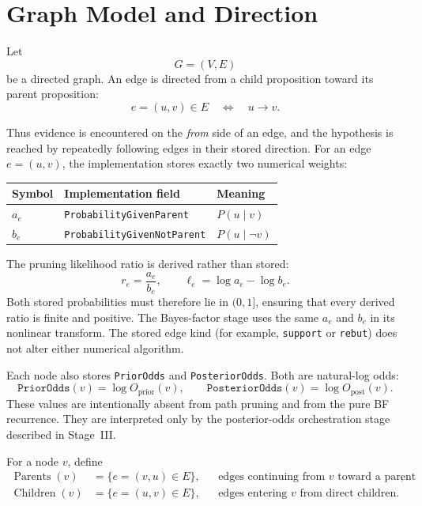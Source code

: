 \documentclass[11pt]{article}
\newcommand{\Parents}{\operatorname{Parents}}
\newcommand{\Children}{\operatorname{Children}}
\begin{document}
\section{Graph Model and Direction}

Let
\[
    G=(V,E)
\]
be a directed graph.  An edge is directed from a child proposition toward its
parent proposition:
\[
    e=(u,v) \in E
    \quad\Longleftrightarrow\quad
    u \longrightarrow v.
\]

Thus evidence is encountered on the \emph{from} side of an edge, and the
hypothesis is reached by repeatedly following edges in their stored direction.
For an edge \(e=(u,v)\), the implementation stores exactly two numerical
weights:

\begin{center}
\begin{tabular}{lll}
\toprule
Symbol & Implementation field & Meaning \\
\midrule
\(a_e\) & \texttt{ProbabilityGivenParent}
    & \(P(u\mid v)\) \\
\(b_e\) & \texttt{ProbabilityGivenNotParent}
    & \(P(u\mid\neg v)\) \\
\bottomrule
\end{tabular}
\end{center}

The pruning likelihood ratio is derived rather than stored:
\[
    r_e=\frac{a_e}{b_e},
    \qquad
    \ell_e=\log a_e-\log b_e.
\]
Both stored probabilities must therefore lie in \((0,1]\), ensuring that
every derived ratio is finite and positive.  The Bayes-factor stage uses the
same \(a_e\) and \(b_e\) in its nonlinear transform.  The stored edge kind
(for example, \texttt{support} or \texttt{rebut}) does not alter either
numerical algorithm.

Each node also stores \texttt{PriorOdds} and \texttt{PosteriorOdds}.  Both are
natural-log odds:
\[
    \texttt{PriorOdds}(v)=\log O_{\mathrm{prior}}(v),
    \qquad
    \texttt{PosteriorOdds}(v)=\log O_{\mathrm{post}}(v).
\]
These values are intentionally absent from path pruning and from the pure BF
recurrence.  They are interpreted only by the posterior-odds orchestration
stage described in Stage~III.

For a node \(v\), define
\begin{align*}
    \Parents(v)
        &= \{e=(v,u)\in E\},
        &&\text{edges continuing from \(v\) toward a parent},\\
    \Children(v)
        &= \{e=(u,v)\in E\},
        &&\text{edges entering \(v\) from direct children}.
\end{align*}
\end{document}
